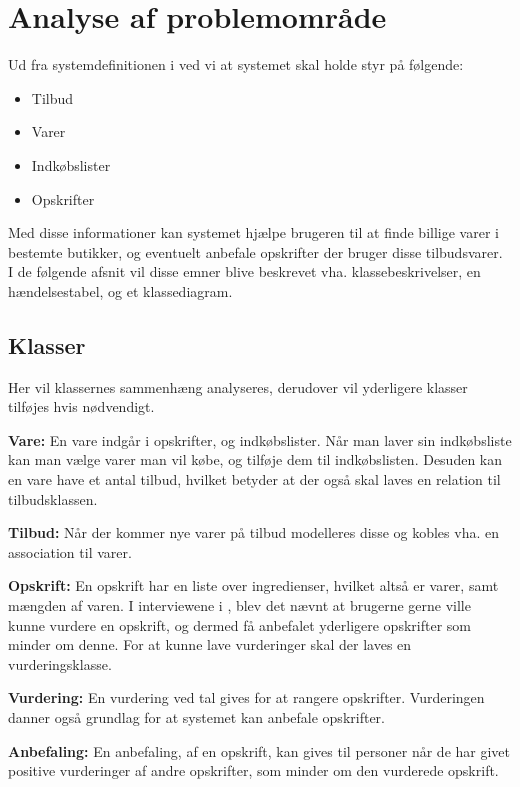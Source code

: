 \section{Analyse af problemområde}

Ud fra systemdefinitionen i  ved vi at systemet skal holde styr på følgende:

\begin{itemize}
	\item Tilbud
	\item Varer
	\item Indkøbslister
	\item Opskrifter
\end{itemize}

Med disse informationer kan systemet hjælpe brugeren til at finde billige varer i bestemte butikker, og eventuelt anbefale opskrifter der bruger disse tilbudsvarer.
I de følgende afsnit vil disse emner blive beskrevet vha. klassebeskrivelser, en hændelsestabel, og et klassediagram.

\subsection{Klasser}
Her vil klassernes sammenhæng analyseres, derudover vil yderligere klasser tilføjes hvis nødvendigt.

\textbf{Vare:}
En vare indgår i opskrifter, og indkøbslister.
Når man laver sin indkøbsliste kan man vælge varer man vil købe, og tilføje dem til indkøbslisten.
Desuden kan en vare have et antal tilbud, hvilket betyder at der også skal laves en relation til tilbudsklassen.

\textbf{Tilbud:}
Når der kommer nye varer på tilbud modelleres disse og kobles vha. en association til varer.

\textbf{Opskrift:}
En opskrift har en liste over ingredienser, hvilket altså er varer, samt mængden af varen.
I interviewene i , blev det nævnt at brugerne gerne ville kunne vurdere en opskrift, og dermed få anbefalet yderligere opskrifter som minder om denne.
For at kunne lave vurderinger skal der laves en vurderingsklasse.

\textbf{Vurdering:}
En vurdering ved tal gives for at rangere opskrifter. 
Vurderingen danner også grundlag for at systemet kan anbefale opskrifter.

\textbf{Anbefaling:}
En anbefaling, af en opskrift, kan gives til personer når de har givet positive vurderinger af andre opskrifter, som minder om den vurderede opskrift.

